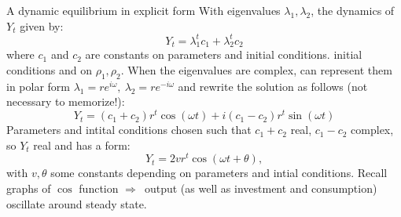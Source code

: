 \documentclass{beamer}
\newcommand{\rarr}{$\Rightarrow$\ }
\begin{document}
\begin{frame}{A dynamic equilibrium in explicit form}
  With eigenvalues $\lambda_1, \lambda_2$, the dynamics of $Y_t$ given by:
  $$
Y_t = \lambda_1^t c_1 + \lambda_2^t c_2
$$
where $ c_1 $ and $ c_2 $ are constants on parameters and initial conditions.
initial conditions and on $ \rho_1, \rho_2 $.
\vfill
When the eigenvalues are complex, can represent them in polar form $
\lambda_1 =  r e^{i \omega}, \  \lambda_2 = r e^{-i \omega}
$ and rewrite the solution as follows (\alert{not necessary to memorize!}):
$$
  Y_t =  (c_1 + c_2) r^t \cos(\omega t) + i (c_1 - c_2) r^t \sin(\omega t)
$$
Parameters and intital conditions chosen such that $c_1+c_2$ real, $c_1-c_2$ complex, so $Y_t$ real and has a form:
$$Y_t = 2 v r^t  \cos (\omega t + \theta),$$ with $v, \theta$ some constants depending on parameters and intial conditions.
\vfill
Recall graphs of $\cos$ function \rarr output (as well as investment and consumption) oscillate around steady state.
\end{frame}
\end{document}
